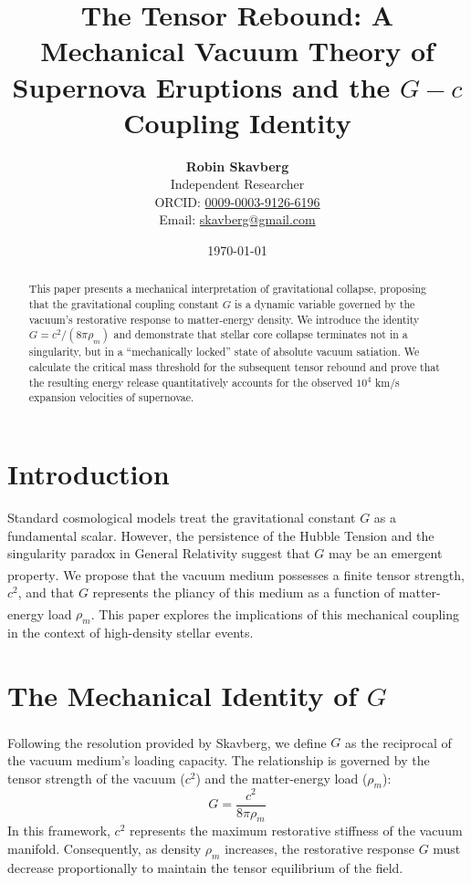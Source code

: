 \documentclass[11pt,a4paper,oneside]{article}
\title{\textbf{The Tensor Rebound: A Mechanical Vacuum Theory of Supernova Eruptions and the $G-c$ Coupling Identity}}
\author{
    \textbf{Robin Skavberg} \\
    \small Independent Researcher \\
    \small ORCID: \href{https://orcid.org/0009-0003-9126-6196}{0009-0003-9126-6196} \\
    \small Email: \href{mailto:skavberg@gmail.com}{skavberg@gmail.com}
}
\date{\today}
\newcommand{\citeS}[1]{\textsuperscript{\cite{#1}}}
\begin{document}
\maketitle

\begin{abstract}
This paper presents a mechanical interpretation of gravitational collapse, proposing that the gravitational coupling constant $G$ is a dynamic variable governed by the vacuum's restorative response to matter-energy density. We introduce the identity $G = c^2 / (8\pi\rho_m)$ and demonstrate that stellar core collapse terminates not in a singularity, but in a ``mechanically locked'' state of absolute vacuum satiation. We calculate the critical mass threshold for the subsequent tensor rebound and prove that the resulting energy release quantitatively accounts for the observed $10^4$ km/s expansion velocities of supernovae.
\end{abstract}

\section{Introduction}
Standard cosmological models treat the gravitational constant $G$ as a fundamental scalar. However, the persistence of the Hubble Tension and the singularity paradox in General Relativity suggest that $G$ may be an emergent property\citeS{Riess2019}. We propose that the vacuum medium possesses a finite tensor strength, $c^2$, and that $G$ represents the pliancy of this medium as a function of matter-energy load $\rho_m$\citeS{Skavberg2026}. This paper explores the implications of this mechanical coupling in the context of high-density stellar events.

\section{The Mechanical Identity of $G$}
Following the resolution provided by Skavberg\citeS{Skavberg2026}, we define $G$ as the reciprocal of the vacuum medium's loading capacity. The relationship is governed by the tensor strength of the vacuum ($c^2$) and the matter-energy load ($\rho_m$):
\begin{equation}
G = \frac{c^2}{8\pi\rho_m}
\end{equation}
In this framework, $c^2$ represents the maximum restorative stiffness of the vacuum manifold. Consequently, as density $\rho_m$ increases, the restorative response $G$ must decrease proportionally to maintain the tensor equilibrium of the field.
\end{document}
